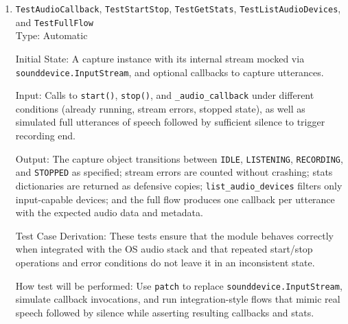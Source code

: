 \documentclass[12pt, titlepage]{article}
\begin{document}
\begin{enumerate}
Output: \texttt{\_is\_speech} combines VAD output and energy thresholds to classify chunks and increments error counters on VAD failures; \texttt{\_process\_audio\_chunk} manages state transitions, pre-buffering, recording buffers, silence counters, and maximum duration enforcement; \texttt{\_start\_recording} copies pre-buffered audio and resets counters; \texttt{\_end\_recording} converts buffered chunks into a normalised \texttt{float32} array, computes metadata (duration, sample rate, timestamp), updates stats, invokes callbacks once per utterance, and returns to the listening state even when callbacks raise exceptions.

Test Case Derivation: These tests correspond directly to FR1 by ensuring that the capture module correctly detects speech, segments utterances, and prepares audio for downstream processing under realistic noise and timing conditions.

How test will be performed: Drive the private methods with synthetic chunks in different states, then assert state, buffer contents, error counters, statistics, and callback invocations.

\item{\texttt{TestAudioCallback}, \texttt{TestStartStop}, \texttt{TestGetStats}, \texttt{TestListAudioDevices}, and \texttt{TestFullFlow}\\}
Type: Automatic

Initial State: A capture instance with its internal stream mocked via \texttt{sounddevice.InputStream}, and optional callbacks to capture utterances.

Input: Calls to \texttt{start()}, \texttt{stop()}, and \texttt{\_audio\_callback} under different conditions (already running, stream errors, stopped state), as well as simulated full utterances of speech followed by sufficient silence to trigger recording end.

Output: The capture object transitions between \texttt{IDLE}, \texttt{LISTENING}, \texttt{RECORDING}, and \texttt{STOPPED} as specified; stream errors are counted without crashing; stats dictionaries are returned as defensive copies; \texttt{list\_audio\_devices} filters only input-capable devices; and the full flow produces one callback per utterance with the expected audio data and metadata.

Test Case Derivation: These tests ensure that the module behaves correctly when integrated with the OS audio stack and that repeated start/stop operations and error conditions do not leave it in an inconsistent state.

How test will be performed: Use \texttt{patch} to replace \texttt{sounddevice.InputStream}, simulate callback invocations, and run integration-style flows that mimic real speech followed by silence while asserting resulting callbacks and stats.
\end{enumerate}
\end{document}
